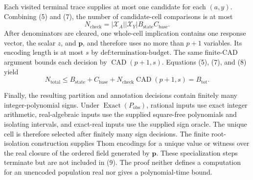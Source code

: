 Each visited terminal trace supplies at most one candidate for each \((a,y)\). Combining (5) and (7), the number of candidate-cell comparisons is at most
\[
N_{\mathrm{check}}
=|\mathcal X_A||\mathcal X_Y|B_{\mathrm{state}}C_{\mathrm{base}}.
\tag{8}
\]
After denominators are cleared, one whole-cell implication contains one response vector, the scalar \(z\), and \(\mathbf p\), and therefore uses no more than \(p+1\) variables. Its encoding length is at most \(s\) by \(\text{def:termination-budget}\). The same finite-CAD argument bounds each decision by \(\operatorname{CAD}(p+1,s)\). Equations (5), (7), and (8) yield
\[
N_{\mathrm{total}}
\leq B_{\mathrm{state}}+C_{\mathrm{base}}
+N_{\mathrm{check}}\operatorname{CAD}(p+1,s)
=B_{\mathrm{tot}}.
\tag{9}
\]

Finally, the resulting partition and annotation decisions contain finitely many integer-polynomial signs. Under \(\operatorname{Exact}(P_{\mathrm{obs}})\), rational inputs use exact integer arithmetic, real-algebraic inputs use the supplied square-free polynomials and isolating intervals, and exact-real inputs use the supplied sign oracle. The unique cell is therefore selected after finitely many sign decisions. The finite root-isolation construction supplies Thom encodings for a unique value or witness over the real closure of the ordered field generated by \(\mathbf p\). These specialization steps terminate but are not included in (9). The proof neither defines a computation for an unencoded population real nor gives a polynomial-time bound.